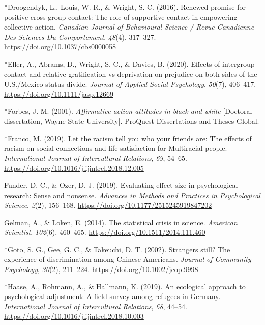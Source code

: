 \documentclass[12pt, letterpaper]{article}
\begin{document}
\leavevmode\hypertarget{ref-2033}{}%
*Droogendyk, L., Louis, W. R., \& Wright, S. C. (2016). Renewed promise
for positive cross-group contact: The role of supportive contact in
empowering collective action. \emph{Canadian Journal of Behavioural
Science / Revue Canadienne Des Sciences Du Comportement}, \emph{48}(4),
317--327. \url{https://doi.org/10.1037/cbs0000058}

\leavevmode\hypertarget{ref-4001}{}%
*Eller, A., Abrams, D., Wright, S. C., \& Davies, B. (2020). Effects of
intergroup contact and relative gratification vs deprivation on
prejudice on both sides of the U.S./Mexico status divide. \emph{Journal
of Applied Social Psychology}, \emph{50}(7), 406--417.
\url{https://doi.org/10.1111/jasp.12669}

\leavevmode\hypertarget{ref-1549}{}%
*Forbes, J. M. (2001). \emph{Affirmative action attitudes in black and
white} {[}Doctoral dissertation, Wayne State University{]}. ProQuest
Dissertations and Theses Global.

\leavevmode\hypertarget{ref-325}{}%
*Franco, M. (2019). Let the racism tell you who your friends are: The
effects of racism on social connections and life-satisfaction for
Multiracial people. \emph{International Journal of Intercultural
Relations}, \emph{69}, 54--65.
\url{https://doi.org/10.1016/j.ijintrel.2018.12.005}

\leavevmode\hypertarget{ref-funder_evaluating_2019}{}%
Funder, D. C., \& Ozer, D. J. (2019). Evaluating effect size in
psychological research: Sense and nonsense. \emph{Advances in Methods
and Practices in Psychological Science}, \emph{2}(2), 156--168.
\url{https://doi.org/10.1177/2515245919847202}

\leavevmode\hypertarget{ref-gelman_statistical_2014}{}%
Gelman, A., \& Loken, E. (2014). The statistical crisis in science.
\emph{American Scientist}, \emph{102}(6), 460--465.
\url{https://doi.org/10.1511/2014.111.460}

\leavevmode\hypertarget{ref-1576}{}%
*Goto, S. G., Gee, G. C., \& Takeuchi, D. T. (2002). Strangers still?
The experience of discrimination among Chinese Americans. \emph{Journal
of Community Psychology}, \emph{30}(2), 211--224.
\url{https://doi.org/10.1002/jcop.9998}

\leavevmode\hypertarget{ref-1949}{}%
*Haase, A., Rohmann, A., \& Hallmann, K. (2019). An ecological approach
to psychological adjustment: A field survey among refugees in Germany.
\emph{International Journal of Intercultural Relations}, \emph{68},
44--54. \url{https://doi.org/10.1016/j.ijintrel.2018.10.003}
\end{document}
